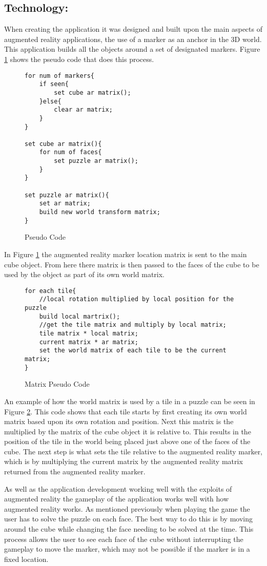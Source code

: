\subsection{Technology: }\label{tech}
When creating the application it was designed and built upon the main aspects of augmented reality applications, the use of a marker as an anchor in the 3D world.
This application builds all the objects around a set of designated markers.
Figure \ref{sc:position_pseudo} shows the pseudo code that does this process.

\begin{figure}[h|]
\centering
\begin{lstlisting}
for num of markers{
	if seen{
		set cube ar matrix();
	}else{
		clear ar matrix;
	}
}

set cube ar matrix(){
	for num of faces{
		set puzzle ar matrix();
	}
}

set puzzle ar matrix(){
	set ar matrix;
	build new world transform matrix;
}
\end{lstlisting}
\caption{Pseudo Code}
\label{sc:position_pseudo}
\end{figure}

In Figure \ref{sc:position_pseudo} the augmented reality marker location matrix is sent to the main cube object.
From here there matrix is then passed to the faces of the cube to be used by the object as part of its own world matrix.

\begin{figure}[h|]
\centering
\begin{lstlisting}
for each tile{
	//local rotation multiplied by local position for the puzzle
	build local martrix();
	//get the tile matrix and multiply by local matrix;
	tile matrix * local matrix;
	current matrix * ar matrix;
	set the world matrix of each tile to be the current matrix;
}
\end{lstlisting}
\caption{Matrix Pseudo Code}
\label{sc:matrix_pseudo}
\end{figure}

An example of how the world matrix is used by a tile in a puzzle can be seen in Figure \ref{sc:matrix_pseudo}.
This code shows that each tile starts by first creating its own world matrix based upon its own rotation and position.
Next this matrix is the multiplied by the matrix of the cube object it is relative to.
This results in the position of the tile in the world being placed just above one of the faces of the cube.
The next step is what sets the tile relative to the augmented reality marker, which is by multiplying the current matrix by the augmented reality matrix returned from the augmented reality marker.

As well as the application development working well with the exploits of augmented reality the gameplay of the application works well with how augmented reality works.
As mentioned previously when playing the game the user has to solve the puzzle on each face.
The best way to do this is by moving around the cube while changing the face needing to be solved at the time.
This process allows the user to see each face of the cube without interrupting the gameplay to move the marker, which may not be possible if the marker is in a fixed location.
